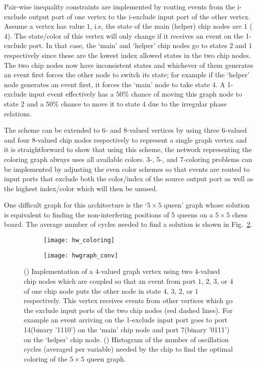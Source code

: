 \documentclass[10pt]{article}
\begin{document}
Pair-wise inequality constraints are implemented by routing events from the i-exclude output port of one vertex to the i-exclude input port of the other vertex. Assume a vertex has value $1$, i.e, the state of the main (helper) chip nodes are $1$ ($4$). The state/color of this vertex will only change if it receives an event on the 1-exclude port. In that case, the `main' and `helper' chip nodes go to states $2$ and $1$ respectively  since these are the lowest index allowed states in the two chip nodes. The two chip nodes now have inconsistent states and whichever of them generates an event first forces the other node to switch its state; for example if the `helper' node generates an event first, it forces the `main' node to take state $4$. A 1-exclude input event effectively has a $50\%$ chance of moving this graph node to state $2$ and a $50\%$ chance to move it to state $4$ due to the irregular phase relations.

The scheme can be extended to 6- and 8-valued vertices by using three 6-valued and four 8-valued chip nodes respectively to represent a single graph vertex and it is straightforward to show that using this scheme, the network representing the coloring graph always uses all available colors. 3-, 5-, and 7-coloring problems can be implemented by adjusting the even color schemes so that events are routed to input ports that exclude both the color/index of the source output port as well as the highest index/color which will then be unused. 

One difficult graph for this architecture is the `$5\times 5$ queen' graph whose solution is equivalent to finding the non-interfering positions of 5 queens on a $5 \times 5$ chess board. The average number of cycles needed to find a solution is shown in Fig.~\ref{fig:hwcoloring_b}. 


\begin{figure}[h]
 \centering
 \begin{subfigure}[b]{0.4\textwidth}
     \texttt{[image: hw\_coloring]} 
     \subcaption{}
     \label{fig:hwcoloring_a}
   \end{subfigure}
   \quad
   \begin{subfigure}[b]{0.4\textwidth}
     \texttt{[image: hwgraph\_conv]} 
     \subcaption{}
     \label{fig:hwcoloring_b}
   \end{subfigure}


   \caption{() Implementation of a 4-valued graph vertex using two 4-valued chip nodes which are coupled so that an event from port $1$, $2$, $3$, or $4$ of one chip node puts the other node in state $4$, $3$, $2$, or $1$ respectively. This vertex receives events from other vertices which go the exclude input ports of the two chip nodes (red dashed lines). For example an event arriving on the 1-exclude input port goes to port 14(binary '1110') on the `main' chip node and port 7(binary '0111') on the `helper' chip node. () Histogram of the number of oscillation cycles (averaged per variable) needed by the chip to find the optimal coloring of the $5\times 5$ queen graph.}
\label{fig:hwcoloring}
\end{figure}	
\end{document}
